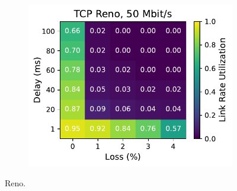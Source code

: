 \begin{figure}[ht]
\begin{subfigure}[b]{0.89cm}
        \includegraphics[width=\linewidth,trim={8cm 0 0 0},clip]{splitting/figures/heatmaps/heatmap_tcp_reno_50mbps.pdf}
        \vspace*{0.2cm}
    \end{subfigure}
    \caption{Reno.}
\end{figure}
